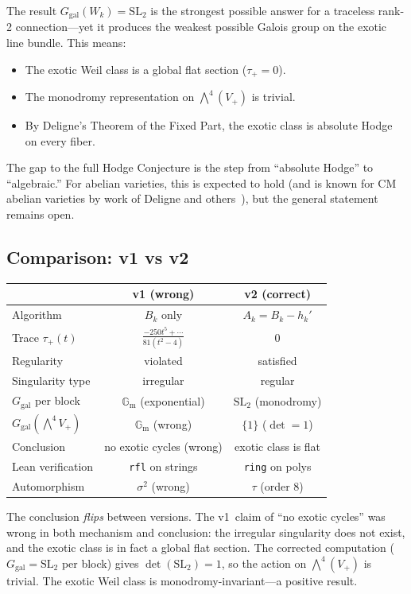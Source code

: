 \documentclass[11pt]{article}
\theoremstyle{plain}
\theoremstyle{definition}
\theoremstyle{remark}
\newcommand{\SL}{\mathrm{SL}}
\newcommand{\Ggal}{G_{\mathrm{gal}}}
\newcommand{\Gm}{\mathbb{G}_{\mathrm{m}}}
\begin{document}
The result $\Ggal(W_k) = \SL_2$ is the strongest possible answer for
a traceless rank-2 connection---yet it produces the weakest possible
Galois group on the exotic line bundle. This means:
\begin{itemize}[nosep]
\item The exotic Weil class is a global flat section ($\tau_+ = 0$).
\item The monodromy representation on $\bigwedge^4(V_+)$ is trivial.
\item By Deligne's Theorem of the Fixed Part, the exotic class is
  absolute Hodge on every fiber.
\end{itemize}

The gap to the full Hodge Conjecture is the step from ``absolute Hodge''
to ``algebraic.'' For abelian varieties, this is expected to hold
(and is known for CM abelian varieties by work of Deligne and
others~\cite{Deligne1971}), but the general statement remains open.

\subsection{Comparison: v1 vs v2}

\begin{center}
\begin{tabular}{lcc}
\toprule
& \textbf{v1 (wrong)} & \textbf{v2 (correct)} \\
\midrule
Algorithm & $B_k$ only & $A_k = B_k - h_k'$ \\
Trace $\tau_+(t)$ & $\frac{-250t^5 + \cdots}{81(t^2-4)}$ & $0$ \\
Regularity & violated & satisfied \\
Singularity type & irregular & regular \\
$\Ggal$ per block & $\Gm$ (exponential) & $\SL_2$ (monodromy) \\
$\Ggal(\bigwedge^4 V_+)$ & $\Gm$ (wrong) & $\{1\}$ ($\det = 1$) \\
Conclusion & no exotic cycles (wrong) & exotic class is flat \\
Lean verification & \texttt{rfl} on strings & \texttt{ring} on polys \\
Automorphism & $\sigma^2$ (wrong) & $\tau$ (order 8) \\
\bottomrule
\end{tabular}
\end{center}

The conclusion \emph{flips} between versions. The v1~claim of ``no exotic
cycles'' was wrong in both mechanism and conclusion: the irregular
singularity does not exist, and the exotic class is in fact a global
flat section. The corrected computation ($\Ggal = \SL_2$ per block)
gives $\det(\SL_2) = 1$, so the action on $\bigwedge^4(V_+)$ is trivial.
The exotic Weil class is monodromy-invariant---a positive result.
\end{document}
